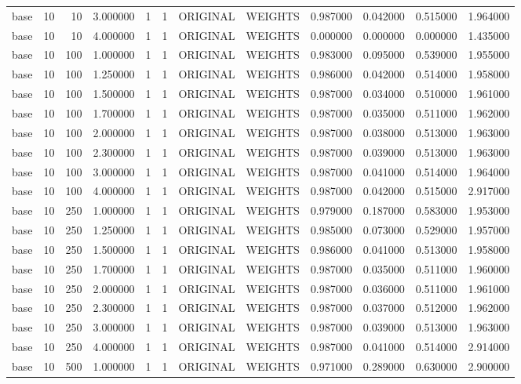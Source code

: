 \begin{tabular}{lrrrllllrrrr}
base & 10 & 10 & 3.000000 & 1 & 1 & ORIGINAL & WEIGHTS & 0.987000 & 0.042000 & 0.515000 & 1.964000 \\
base & 10 & 10 & 4.000000 & 1 & 1 & ORIGINAL & WEIGHTS & 0.000000 & 0.000000 & 0.000000 & 1.435000 \\
base & 10 & 100 & 1.000000 & 1 & 1 & ORIGINAL & WEIGHTS & 0.983000 & 0.095000 & 0.539000 & 1.955000 \\
base & 10 & 100 & 1.250000 & 1 & 1 & ORIGINAL & WEIGHTS & 0.986000 & 0.042000 & 0.514000 & 1.958000 \\
base & 10 & 100 & 1.500000 & 1 & 1 & ORIGINAL & WEIGHTS & 0.987000 & 0.034000 & 0.510000 & 1.961000 \\
base & 10 & 100 & 1.700000 & 1 & 1 & ORIGINAL & WEIGHTS & 0.987000 & 0.035000 & 0.511000 & 1.962000 \\
base & 10 & 100 & 2.000000 & 1 & 1 & ORIGINAL & WEIGHTS & 0.987000 & 0.038000 & 0.513000 & 1.963000 \\
base & 10 & 100 & 2.300000 & 1 & 1 & ORIGINAL & WEIGHTS & 0.987000 & 0.039000 & 0.513000 & 1.963000 \\
base & 10 & 100 & 3.000000 & 1 & 1 & ORIGINAL & WEIGHTS & 0.987000 & 0.041000 & 0.514000 & 1.964000 \\
base & 10 & 100 & 4.000000 & 1 & 1 & ORIGINAL & WEIGHTS & 0.987000 & 0.042000 & 0.515000 & 2.917000 \\
base & 10 & 250 & 1.000000 & 1 & 1 & ORIGINAL & WEIGHTS & 0.979000 & 0.187000 & 0.583000 & 1.953000 \\
base & 10 & 250 & 1.250000 & 1 & 1 & ORIGINAL & WEIGHTS & 0.985000 & 0.073000 & 0.529000 & 1.957000 \\
base & 10 & 250 & 1.500000 & 1 & 1 & ORIGINAL & WEIGHTS & 0.986000 & 0.041000 & 0.513000 & 1.958000 \\
base & 10 & 250 & 1.700000 & 1 & 1 & ORIGINAL & WEIGHTS & 0.987000 & 0.035000 & 0.511000 & 1.960000 \\
base & 10 & 250 & 2.000000 & 1 & 1 & ORIGINAL & WEIGHTS & 0.987000 & 0.036000 & 0.511000 & 1.961000 \\
base & 10 & 250 & 2.300000 & 1 & 1 & ORIGINAL & WEIGHTS & 0.987000 & 0.037000 & 0.512000 & 1.962000 \\
base & 10 & 250 & 3.000000 & 1 & 1 & ORIGINAL & WEIGHTS & 0.987000 & 0.039000 & 0.513000 & 1.963000 \\
base & 10 & 250 & 4.000000 & 1 & 1 & ORIGINAL & WEIGHTS & 0.987000 & 0.041000 & 0.514000 & 2.914000 \\
base & 10 & 500 & 1.000000 & 1 & 1 & ORIGINAL & WEIGHTS & 0.971000 & 0.289000 & 0.630000 & 2.900000 \\

\end{tabular}
